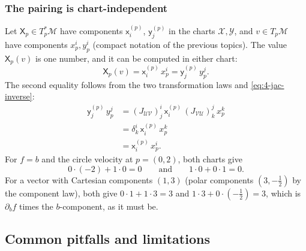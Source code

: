 \documentclass[11pt]{article}
\newcommand{\TpM}{T_p\mathcal M}
\newcommand{\TpsM}{T_p^*\mathcal M}
\begin{document}
\subsubsection*{The pairing is chart-independent}
Let $\mathsf X_p\in\TpsM$ have components $\mathsf x^{(p)}_i$, $\mathsf y^{(p)}_j$ in the charts $\mathcal X,\mathcal Y$, and $v\in\TpM$ have components $x^i_p,y^i_p$ (compact notation of the previous topics). The value $\mathsf X_p(v)$ is one number, and it can be computed in either chart:
\[
\mathsf X_p(v)=\mathsf x^{(p)}_i\,x^i_p=\mathsf y^{(p)}_j\,y^j_p.
\]
The second equality follows from the two transformation laws and \eqref{eq:4-jac-inverse}:
\begin{align*}
\mathsf y^{(p)}_j\,y^j_p&=(J_{\mathcal{UV}})^i_j\,\mathsf x^{(p)}_i\,(J_{\mathcal{VU}})^j_k\,x^k_p\\
&=\delta^i_k\,\mathsf x^{(p)}_i\,x^k_p\\
&=\mathsf x^{(p)}_i\,x^i_p.
\end{align*}
For $f=b$ and the circle velocity at $p=(0,2)$, both charts give
\[
0\cdot(-2)+1\cdot0=0\qquad\text{and}\qquad1\cdot0+0\cdot1=0.
\]
For a vector with Cartesian components $(1,3)$ (polar components $(3,-\tfrac12)$ by the component law), both give $0\cdot1+1\cdot3=3$ and $1\cdot3+0\cdot(-\tfrac12)=3$, which is $\partial_bf$ times the $b$-component, as it must be.

\subsection*{Common pitfalls and limitations}
\end{document}

